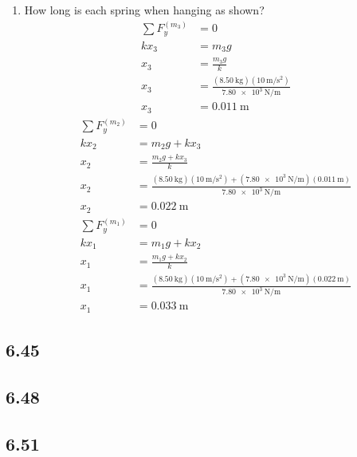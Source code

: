 \documentclass{article}
\begin{document}
\begin{enumerate}[label = \textbf{(\alph*)}]
	\item How long is each spring when hanging as shown?
		\begin{align*}
			\sum F_y^{(m_3)} & = 0 \\
			kx_3 & = m_3g \\
			x_3 & = \frac{m_3g}{k} \\
			x_3 & = \frac{(\SI{8.50}{\kilogram})(\SI{10}{\meter \per \second \squared})}{\SI{7.80e3}{\newton \per \meter}} \\
			x_3 & = \SI{0.011}{\meter}
		\end{align*}
		\begin{align*}
			\sum F_y^{(m_2)} & = 0 \\
			kx_2 & = m_2g + kx_3 \\
			x_2 & = \frac{m_2g + kx_3}{k} \\
			x_2 & = \frac{(\SI{8.50}{\kilogram})(\SI{10}{\meter \per \second \squared}) + (\SI{7.80e3}{\newton \per \meter})(\SI{0.011}{\meter})}{\SI{7.80e3}{\newton \per \meter}} \\
			x_2 & = \SI{0.022}{\meter}
		\end{align*}
		\begin{align*}
			\sum F_y^{(m_1)} & = 0 \\
			kx_1 & = m_1g + kx_2 \\
			x_1 & = \frac{m_1g + kx_2}{k} \\
			x_1 & = \frac{(\SI{8.50}{\kilogram})(\SI{10}{\meter \per \second \squared}) + (\SI{7.80e3}{\newton \per \meter})(\SI{0.022}{\meter})}{\SI{7.80e3}{\newton \per \meter}} \\
			x_1 & = \SI{0.033}{\meter}
		\end{align*}
\end{enumerate}

\subsection{6.45}

\subsection{6.48}

\subsection{6.51}
\end{document}
